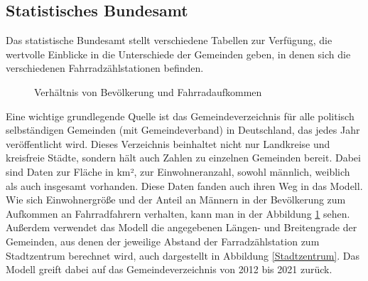 \documentclass[a4paper,12pt]{thesis}
\begin{document}
\subsection{Statistisches Bundesamt}

Das statistische Bundesamt stellt verschiedene Tabellen zur Verfügung, die wertvolle Einblicke in die Unterschiede der Gemeinden geben, in denen sich die verschiedenen Fahrradzählstationen befinden.\\

\begin{figure}%
	\centering
	\qquad
	\caption{Verhältnis von Bevölkerung und Fahrradaufkommen}%
	\label{fig:Gemeindevz}%
\end{figure}

Eine wichtige grundlegende Quelle ist das Gemeindeverzeichnis für alle politisch selbständigen Gemeinden (mit Gemeindeverband) in Deutschland, das jedes Jahr veröffentlicht wird. Dieses Verzeichnis beinhaltet nicht nur Landkreise und kreisfreie Städte, sondern hält auch Zahlen zu einzelnen Gemeinden bereit. Dabei sind Daten zur Fläche in km², zur Einwohneranzahl, sowohl männlich, weiblich als auch insgesamt vorhanden. Diese Daten fanden auch ihren Weg in das Modell. Wie sich Einwohnergröße und der Anteil an Männern in der Bevölkerung zum Aufkommen an Fahrradfahrern verhalten, kann man in der Abbildung \ref{fig:Gemeindevz} sehen. Außerdem verwendet das Modell die angegebenen Längen- und Breitengrade der Gemeinden, aus denen der jeweilige Abstand der Farradzählstation zum Stadtzentrum berechnet wird, auch dargestellt in Abbildung \ref{Stadtzentrum}. Das Modell greift dabei auf das Gemeindeverzeichnis von 2012 bis 2021 zurück.\\
\end{document}
